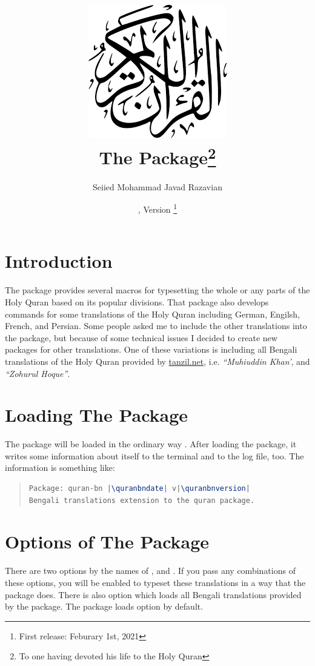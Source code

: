 \documentclass[a4paper]{ltxdoc}
\title{\includegraphics[scale=.3]{quran.png}\\
The \xpackage{quran-bn} Package\footnote{To one having devoted his life to the Holy Quran}\\
}
\author{Seiied Mohammad Javad Razavian\\\xemail{javadr@gmail.com}}
\date{\quranbndate,  Version \quranbnversion\footnote{First release: Feburary 1st, 2021}}
\begin{document}
\maketitle

\tableofcontents

\section{Introduction}
The  package provides several macros for
typesetting the whole or any parts of the Holy Quran based on its popular divisions. That package also develops
commands for some translations of the Holy Quran including German, Engilsh, French, and Persian.
Some people asked me to include the other translations into the  package,
but because of some technical issues I decided to create new packages for other translations.
One of these variations is  including all Bengali translations of the Holy Quran
provided by \url{tanzil.net}, i.e. \emph{``Muhiuddin Khan'}, and \emph{``Zohurul Hoque''}.


\section{Loading The Package}
The package will be loaded in the ordinary way
.
After loading the package, it writes some information about itself to the
terminal and to the log file, too. The information is something like:

\begin{quote}
\begin{lstlisting}[style=BashInputStyle, language=tex, escapechar={|}]
Package: quran-bn |\quranbndate| v|\quranbnversion|
Bengali translations extension to the quran package.
\end{lstlisting}
\end{quote}


\section{Options of The Package}\label{sec:qurantypesetting}
There are two options by the names of , and .
If you pass any combinations of these options, you will be enabled to typeset these translations in a way
that the  package does.
There is also  option which loads all Bengali translations provided by the  package.
The package loads  option by default.
\end{document}
